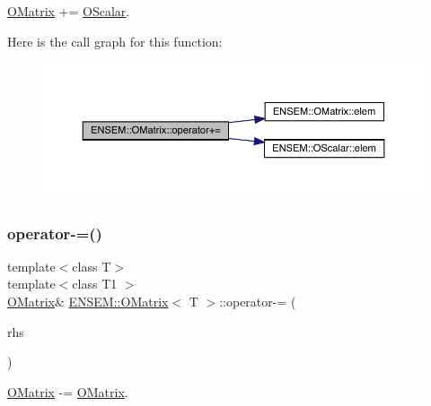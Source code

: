\mbox{\hyperlink{classENSEM_1_1OMatrix}{O\+Matrix}} += \mbox{\hyperlink{classENSEM_1_1OScalar}{O\+Scalar}}. 

Here is the call graph for this function\+:
\nopagebreak
\begin{figure}[H]
\begin{center}
\leavevmode
\includegraphics[width=350pt]{dd/d80/classENSEM_1_1OMatrix_ab488697fd72f3891fede3d00f8deb019_cgraph}
\end{center}
\end{figure}
\mbox{\label{classENSEM_1_1OMatrix_a4c9bcdd861f4439d1b165ec5285cf55f}} 
\subsubsection{\texorpdfstring{operator-\/=()}{operator-=()}\hspace{0.1cm}{\footnotesize\ttfamily [1/4]}}
{\footnotesize\ttfamily template$<$class T$>$ \\
template$<$class T1 $>$ \\
\mbox{\hyperlink{classENSEM_1_1OMatrix}{O\+Matrix}}\& \mbox{\hyperlink{classENSEM_1_1OMatrix}{E\+N\+S\+E\+M\+::\+O\+Matrix}}$<$ T $>$\+::operator-\/= (\begin{DoxyParamCaption}\item[{const \mbox{\hyperlink{classENSEM_1_1OMatrix}{O\+Matrix}}$<$ T1 $>$ \&}]{rhs }\end{DoxyParamCaption})\hspace{0.3cm}{\ttfamily [inline]}}



\mbox{\hyperlink{classENSEM_1_1OMatrix}{O\+Matrix}} -\/= \mbox{\hyperlink{classENSEM_1_1OMatrix}{O\+Matrix}}. 

